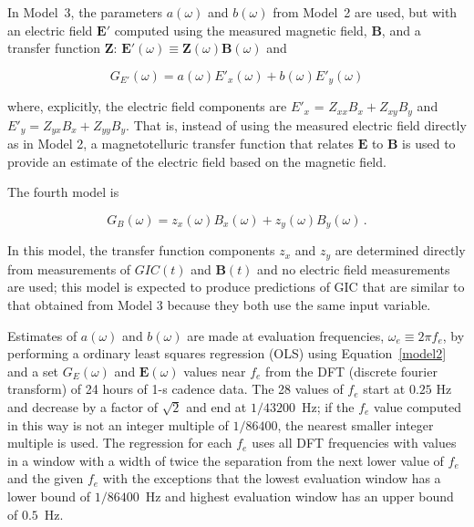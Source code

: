 \documentclass[draft,linenumbers]{agujournal2018}
\begin{document}
In Model~3, the parameters $a(\omega)$ and $b(\omega)$ from Model~2 are used, but with an electric field $\mathbf{E}'$ computed using the measured magnetic field, $\mathbf{B}$, and a transfer function $\boldsymbol{Z}$: $\mathbf{E}'(\omega) \equiv \boldsymbol{Z}(\omega)\mathbf{B}(\omega)$ and

\setcounter{equation}{2}
\begin{linenomath*}
\begin{equation}
G_{E'}(\omega) = a(\omega)E'_x(\omega) + b(\omega)E'_y(\omega)
\label{model3}
\end{equation}
\end{linenomath*}

\noindent
where, explicitly, the electric field components are $E'_x$ = $Z_{xx}B_x + Z_{xy}B_y$ and $E'_y = Z_{yx}B_x + Z_{yy}B_y$. 
That is, instead of using the measured electric field directly as in Model 2, a magnetotelluric transfer function that relates $\mathbf{E}$ to $\mathbf{B}$ is used to provide an estimate of the electric field based on the magnetic field.



The fourth model is

\begin{linenomath*}
\begin{equation}
G_B(\omega) = z_x(\omega)B_x(\omega) + z_y(\omega)B_y(\omega)\,.
\label{model4}
\end{equation}
\end{linenomath*}

\noindent
In this model, the transfer function components $z_x$ and $z_y$ are determined directly from measurements of $GIC(t)$ and $\mathbf{B}(t)$ and no electric field measurements are used; this model is expected to produce predictions of GIC that are similar to that obtained from Model 3 because they both use the same input variable.

Estimates of $a(\omega)$ and $b(\omega)$ are made at evaluation frequencies, $\omega_e \equiv 2\pi f_e$, by performing a ordinary least squares regression (OLS) using Equation~\ref{model2} and a set $G_E(\omega)$ and $\mathbf{E}(\omega)$ values near $f_e$ from the DFT (discrete fourier transform) of 24 hours of 1-s cadence data. The 28 values of $f_e$ start at $0.25$ Hz and decrease by a factor of $\sqrt{2}$ and end at $1/43200$~Hz; if the $f_e$ value computed in this way is not an integer multiple of $1/86400$, the nearest smaller integer multiple is used. The regression for each $f_e$ uses all DFT frequencies with values in a window with a width of twice the separation from the next lower value of $f_e$ and the given $f_e$ with the exceptions that the lowest evaluation window has a lower bound of $1/86400$~Hz and highest evaluation window has an upper bound of $0.5$~Hz. 
\end{document}

